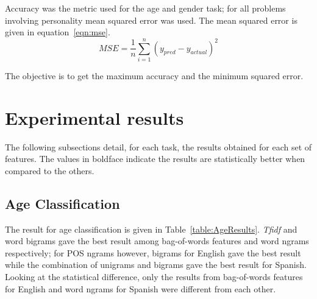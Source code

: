 \documentclass[a4paper]{llncs}
\begin{document}
Accuracy was the metric used for the age and gender task; for all problems involving personality mean squared error was used. The mean squared error is given in equation~\ref{eqn:mse}.
\begin{equation}
  MSE =\frac{1}{n} \sum_{i=1}^n \left( y_{pred}-y_{actual}\right)^2 
  \label{eqn:mse}
\end{equation}

The objective is to get the maximum accuracy and the minimum squared error. 



\section{Experimental results}
The following subsections detail, for each task, the results obtained for each set of features. The values in boldface indicate the results are statistically better when compared to the others. 

\subsection{Age Classification}
The result for age classification is given in Table~\ref{table:AgeResults}.
\textit{Tfidf} and word bigrams gave the best result among bag-of-words features and word ngrams respectively; for POS ngrams however, bigrams for English gave the best result while the combination of unigrams and bigrams gave the best result for Spanish. Looking at the statistical difference, only the results from bag-of-words features for English and word ngrams for Spanish were different from each other. 
\end{document}

